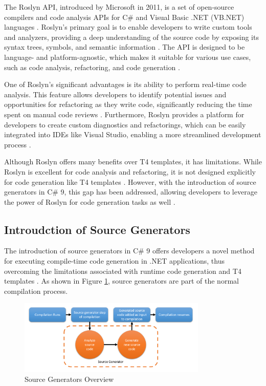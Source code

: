 The Roslyn API, introduced by Microsoft in 2011, is a set of open-source compilers and code analysis APIs for C\# and Visual Basic .NET (VB.NET) languages \cite{CSharpRoslyn}. Roslyn's primary goal is to enable developers to write custom tools and analyzers, providing a deep understanding of the source code by exposing its syntax trees, symbols, and semantic information \cite{Vermeir2022}. The API is designed to be language- and platform-agnostic, which makes it suitable for various use cases, such as code analysis, refactoring, and code generation \cite{Vermeir2022}.

One of Roslyn's significant advantages is its ability to perform real-time code analysis. This feature allows developers to identify potential issues and opportunities for refactoring as they write code, significantly reducing the time spent on manual code reviews \cite{Vermeir2022}. Furthermore, Roslyn provides a platform for developers to create custom diagnostics and refactorings, which can be easily integrated into IDEs like Visual Studio, enabling a more streamlined development process \cite{CSharpRoslyn}.

Although Roslyn offers many benefits over T4 templates, it has limitations. While Roslyn is excellent for code analysis and refactoring, it is not designed explicitly for code generation like T4 templates \cite{Vermeir2022}. However, with the introduction of source generators in C\# 9, this gap has been addressed, allowing developers to leverage the power of Roslyn for code generation tasks as well \cite{Carter2020}.

\subsection{Introudction of Source Generators}

The introduction of source generators in C\# 9 offers developers a novel method for executing compile-time code generation in .NET applications, thus overcoming the limitations associated with runtime code generation and T4 templates \cite{Torgersen2020}. As shown in Figure \ref{fig:source_generators_workflow}, source generators are part of the normal compilation process.

\begin{figure}[H]
\centering
\includegraphics[width=0.8\textwidth]{graphics/source-generator-visualization.png}
\caption{Source Generators Overview}
\label{fig:source_generators_workflow}
\end{figure}

